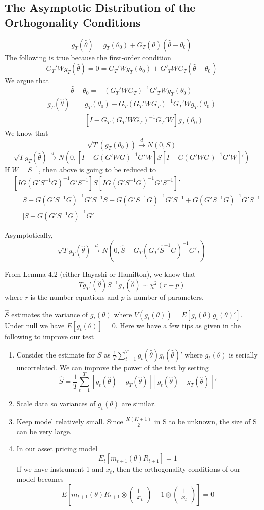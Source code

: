 \documentclass[11pt, a4paper, oneside]{article}
\theoremstyle{definition}
\theoremstyle{proposition}
\theoremstyle{corollary}
\theoremstyle{lemma}
\theoremstyle{theorem}
\begin{document}
\subsection{The Asymptotic Distribution of the Orthogonality Conditions}
$$g_T(\hat{\theta}) = g_T(\theta_0) + G_T(\bar{\theta})(\hat{\theta}- \theta_0)$$
The following is true because the first-order condition
$$G_T'Wg_T(\hat{\theta}) = 0 = G_T'Wg_T(\theta_0) + G'_T WG_T(\hat{\theta}- \theta_0)$$ 
We argue that $$\hat{\theta} - \theta_0 = - (G_T'WG_T)^{-1}G'_TWg_T(\theta_0)$$
\begin{align*}
g_T(\hat{\theta}) &= g_T(\theta_0) - G_T(G_T'WG_T)^{-1}G_T'Wg_T(\theta_0)\\
&=[I - G_T(G_T'WG_T)^{-1}G_T'W]g_T(\theta_0)
\end{align*}
We know that $$\sqrt{T}(g_T(\theta_0)) \overset{d}{\to} N(0, S)$$
$$\sqrt{T}g_T(\hat{\theta}) \overset{d}{\to} N(0, [I- G(G'WG)^{-1} G'W]S[I- G(G'WG)^{-1} G'W]')$$
If $W =S^{-1}$, then above is going to be reduced to 
\begin{align*}
&[IG(G'S^{-1}G)^{-1}G'S^{-1}]S[IG(G'S^{-1}G)^{-1}G'S^{-1}]' \\ 
&= S -G(G'S^{-1}G)^{-1}G'S^{-1}S - G(G'S^{-1}G)^{-1}G'S^{-1} + G(G'S^{-1}G)^{-1}G'S^{-1} \\
&=[S- G(G'S^{-1}G)^{-1}G'\end{align*}

Asymptotically, $$\sqrt{T}g_T(\hat{\theta}) \overset{d}{\to} N(0, \hat{S} - G_T(G_T'\hat{S}^{-1}G)^{-1}G'_T)$$

From Lemma 4.2 (either Hayashi or Hamilton), we know that $$Tg_T'(\hat{\theta})S^{-1}g_T(\hat{\theta}) \sim \chi^2(r - p) $$
where $r$ is the number equations and $p$ is number of parameters.   

$\hat{S}$ estimates the variance of $g_t(\theta)$ where $V(g_t(\theta)) = E[g_t(\theta)g_t(\theta)']$. Under null we have $E[g_t(\theta)]=0$. Here we have a few tips as given in the following to improve our test
\begin{enumerate}
\item Consider the estimate for $S$ as $\frac{1}{T}\sum_{t=1}^T g_t(\hat{\theta})g_t(\hat{\theta})'$ where  $g_t(\theta)$ is serially uncorrelated. We can improve the power of the test by setting
$$\hat{S} = \frac{1}{T} \sum_{t=1}^T [g_t(\hat{\theta})- g_T(\hat{\theta})][g_t(\hat{\theta}) - g_T(\hat{\theta})]'$$
\item Scale data so variances of $g_t(\theta)$ are similar. 
\item Keep model relatively small. Since $\frac{K(K+1)}{2}$ in S to be unknown, the size of S can be very large. 
\item In our asset pricing model
$$E_t[m_{t+1}(\theta)R_{t+1}]= 1$$ 
If we have instrument 1 and $x_t$, then the orthogonality conditions of our model becomes
$$E\left[m_{t+1}(\theta)R_{t+1}\otimes\begin{pmatrix} 1\\ x_t\end{pmatrix} - 1\otimes\begin{pmatrix} 1 \\ x_t\end{pmatrix}\right]=0$$
\end{enumerate}
\end{document}
